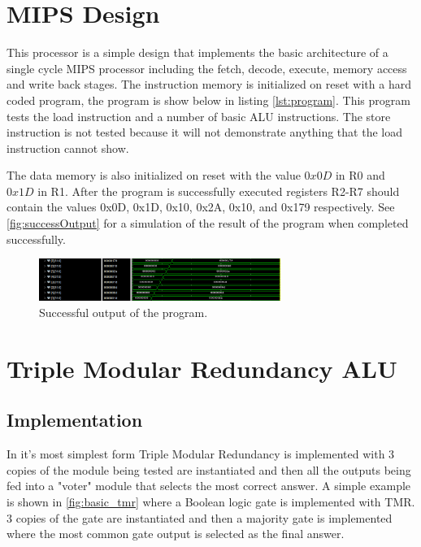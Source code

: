 \documentclass[12pt]{article}
\begin{document}
\section{MIPS Design}
This processor is a simple design that implements the basic architecture of a single cycle MIPS processor including the fetch, decode, execute, memory access and write back stages. The instruction memory is initialized on reset with a hard coded program, the program is show below in listing \ref{lst:program}. This program tests the load instruction and a number of basic ALU instructions. The store instruction is not tested because it will not demonstrate anything that the load instruction cannot show.



The data memory is also initialized on reset with the value $0x0D$ in R0 and $0x1D$ in R1. After the program is successfully executed registers R2-R7 should contain the values 0x0D, 0x1D, 0x10, 0x2A, 0x10, and 0x179 respectively. See \autoref{fig:successOutput} for a simulation of the result of the program when completed successfully.

\begin{figure}[H]
    \centering
    \includegraphics[width=0.7\textwidth]{success.png}
    \caption{Successful output of the program.}
    \label{fig:successOutput}
\end{figure}

\section{Triple Modular Redundancy ALU}
\subsection{Implementation}
In it's most simplest form Triple Modular Redundancy is implemented with 3 copies of the module being tested are instantiated and then all the outputs being fed into a "voter" module that selects the most correct answer. A simple example is shown in \autoref{fig:basic_tmr} where a Boolean logic gate is implemented with TMR. 3 copies of the gate are instantiated and then a majority gate is implemented where the most common gate output is selected as the final answer.
\end{document}
